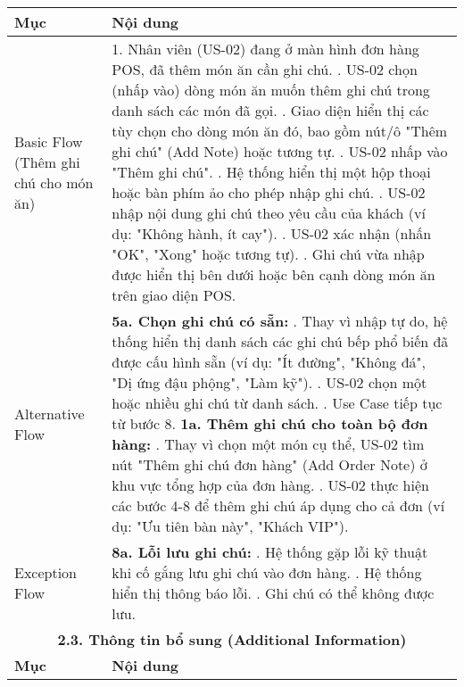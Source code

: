 \begin{longtable}{|m{4cm}|p{11cm}|}
\hline
\textbf{Mục} & \textbf{Nội dung} \\
\hline
Basic Flow (Thêm ghi chú cho món ăn) & 1. Nhân viên (US-02) đang ở màn hình đơn hàng POS, đã thêm món ăn cần ghi chú. \newline 2. US-02 chọn (nhấp vào) dòng món ăn muốn thêm ghi chú trong danh sách các món đã gọi. \newline 3. Giao diện hiển thị các tùy chọn cho dòng món ăn đó, bao gồm nút/ô "Thêm ghi chú" (Add Note) hoặc tương tự. \newline 4. US-02 nhấp vào "Thêm ghi chú". \newline 5. Hệ thống hiển thị một hộp thoại hoặc bàn phím ảo cho phép nhập ghi chú. \newline 6. US-02 nhập nội dung ghi chú theo yêu cầu của khách (ví dụ: "Không hành, ít cay"). \newline 7. US-02 xác nhận (nhấn "OK", "Xong" hoặc tương tự). \newline 8. Ghi chú vừa nhập được hiển thị bên dưới hoặc bên cạnh dòng món ăn trên giao diện POS. \\
\hline
Alternative Flow & \textbf{5a. Chọn ghi chú có sẵn:} \newline    1. Thay vì nhập tự do, hệ thống hiển thị danh sách các ghi chú bếp phổ biến đã được cấu hình sẵn (ví dụ: "Ít đường", "Không đá", "Dị ứng đậu phộng", "Làm kỹ"). \newline    2. US-02 chọn một hoặc nhiều ghi chú từ danh sách. \newline    3. Use Case tiếp tục từ bước 8. \newline \textbf{1a. Thêm ghi chú cho toàn bộ đơn hàng:} \newline    1. Thay vì chọn một món cụ thể, US-02 tìm nút "Thêm ghi chú đơn hàng" (Add Order Note) ở khu vực tổng hợp của đơn hàng. \newline    2. US-02 thực hiện các bước 4-8 để thêm ghi chú áp dụng cho cả đơn (ví dụ: "Ưu tiên bàn này", "Khách VIP"). \\
\hline
Exception Flow & \textbf{8a. Lỗi lưu ghi chú:} \newline    1. Hệ thống gặp lỗi kỹ thuật khi cố gắng lưu ghi chú vào đơn hàng. \newline    2. Hệ thống hiển thị thông báo lỗi. \newline    3. Ghi chú có thể không được lưu. \\
\hline
\multicolumn{2}{|c|}{\textbf{2.3. Thông tin bổ sung (Additional Information)}} \\
\hline
\textbf{Mục} & \textbf{Nội dung} \\

\end{longtable}
